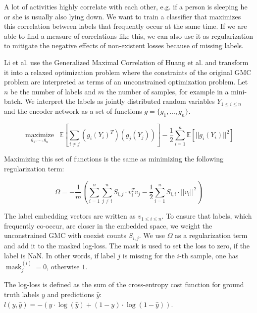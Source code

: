 A lot of activities highly correlate with each other, e.g. if a person is sleeping he or she is usually also lying down. We want to train a classifier that maximizes this correlation between labels that frequently occur at the same time. If we are able to find a measure of correlations like this, we can also use it as regularization to mitigate the negative effects of non-existent losses because of missing labels.

Li et al. use the Generalized Maximal Correlation of Huang et al. \cite[Definition 2]{Huang2017} and transform it into a relaxed optimization problem where the constraints of the original GMC problem are interpreted as terms of an unconstrained optimization problem. Let $n$ be the number of labels and $m$ the number of samples, for example in a mini-batch. We interpret the labels as jointly distributed random variables $Y_{1\leq i \leq n}$ and the encoder network as a set of functions $g = \{g_1, \dots, g_n\}$.

\begin{equation}
	\underset{g_1, \dots, g_n}{\operatorname{maximize}} \hspace{6pt} \mathbb{E}\left[\sum_{i\neq j} 
	(g_i(Y_i)^T)(g_j(Y_j)) \right] - \frac{1}{2} \sum_{i=1}^{n} \mathbb{E}[||g_i(Y_i)||^2]
\end{equation}

Maximizing this set of functions is the same as minimizing the following regularization term:

\begin{equation}
	\Omega = - \frac{1}{m} \left(\sum_{i=1}^{n} \sum_{j \neq i}^{n} S_{i,j}\cdot v_i^T v_j - \frac{1}{2} \sum_{i=1}^{n} S_{i,i}\cdot ||v_i||^2 \right)
\end{equation}

The label embedding vectors are written as $v_{1\leq i \leq n}$. To ensure that labels, which frequently co-occur, are closer in the embedded space, we weight the unconstrained GMC with coexist counts $S_{i,j}$. We use $\Omega$ as a regularization term and add it to the masked log-loss. The mask is used to set the loss to zero, if the label is NaN. In other words, if label $j$ is missing for the $i$-th sample, one has $\operatorname{mask}_j^{(i)} = 0$, otherwise $1$.

The log-loss is defined as the sum of the cross-entropy cost function for ground truth labels $y$ and predictions $\hat{y}$: $l(y, \hat{y}) = -(y \cdot \log(\hat{y}) + (1 - y) \cdot \log(1 - \hat{y}))$.

